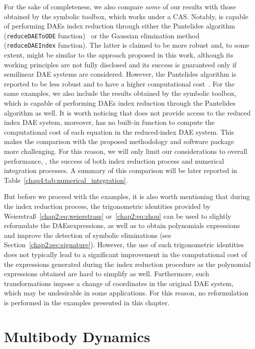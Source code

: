 For the sake of completeness, we also compare \emph{some} of our results with those obtained by the \Matlab{} symbolic toolbox, which works under a \MuPAD{} \ac{CAS}. Notably, \Matlab{} is capable of performing \acp{DAE} index reduction through either the Pantelides algorithm (\texttt{reduceDAEToODE} function)~\cite{pantelides1988consistent} or the Gaussian elimination method (\texttt{reduceDAEIndex} function). The latter is claimed to be more robust and, to some extent, might be similar to the approach proposed in this work, although its working principles are not fully disclosed and its success is guaranteed only if semilinear \ac{DAE} systems are considered. However, the Pantelides algorithm is reported to be less robust and to have a higher computational cost~\cite{matlabdaes}. For the same examples, we also include the results obtained by the \Mathematica{} symbolic toolbox, which is capable of performing \acp{DAE} index reduction through the Pantelides algorithm as well. It is worth noticing that \Mathematica{} does not provide access to the reduced index \ac{DAE} system, moreover, \Matlab{} has no built-in function to compute the computational cost of each equation in the reduced-index \ac{DAE} system. This makes the comparison with the proposed methodology and software package more challenging. For this reason, we will only limit our considerations to overall performance, \ie{}, the success of both index reduction process and numerical integration processes. A summary of this comparison will be later reported in Table~\eqref{chap4:tab:numerical_integration}.

But before we proceed with the examples, it is also worth mentioning that during the index reduction process, the trigonometric identities provided by Weierstra{\ss}~\eqref{chap2:eq:weierstrass} or~\eqref{chap2:eq:zhou} can be used to slightly reformulate the \acp{DAE}expressions, as well as to obtain polynomials expressions and improve the detection of symbolic eliminations (see Section~\ref{chap2:sec:signature}). However, the use of such trigonometric identities does not typically lead to a significant improvement in the computational cost of the expressions generated during the index reduction procedure as the polynomial expressions obtained are hard to simplify as well. Furthermore, such transformations impose a change of coordinates in the original \ac{DAE} system, which may be undesirable in some applications. For this reason, no reformulation is performed in the examples presented in this chapter.

\section{Multibody Dynamics}
\label{chap4:sec:mbd}

